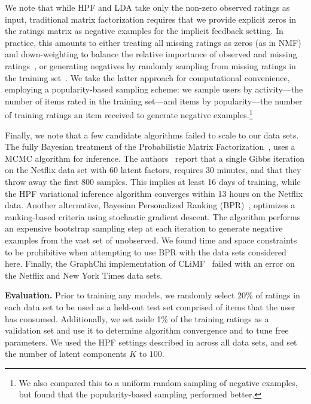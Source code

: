 We note that while HPF and LDA take only the non-zero observed
ratings as input, traditional matrix factorization requires that we
provide explicit zeros in the ratings matrix as negative examples for
the implicit feedback setting. In practice, this amounts to either
treating all missing ratings as zeros (as in NMF) and down-weighting
to balance the relative importance of observed and missing
ratings~\cite{Hu:2008p9402}, or generating negatives by randomly
sampling from missing ratings in the training
set~\cite{Gantner:2012p9364,Dror:2012a,Paquet:2013p9197}.  We take the
latter approach for computational convenience, employing a
popularity-based sampling scheme: we sample users by activity---the
number of items rated in the training set---and items by
popularity---the number of training ratings an item received to
generate negative examples.\footnote{We also compared this to a
  uniform random sampling of negative examples, but found that the
  popularity-based sampling performed better.} 

Finally, we note that a few candidate algorithms failed to scale to
our data sets. The fully Bayesian treatment of the Probabilistic
Matrix Factorization~\cite{Salakhutdinov:2008}, uses a MCMC algorithm
for inference. The authors~\cite{Salakhutdinov:2008} report that a
single Gibbs iteration on the Netflix data set with 60 latent factors,
requires 30 minutes, and that they throw away the first 800
samples. This implies at least 16 days of training, while the HPF
variational inference algorithm converges within 13 hours on the
Netflix data. Another alternative, Bayesian Personalized Ranking
(BPR)~\cite{Rendle:2009p9243,Gantner:2012p9364}, optimizes a
ranking-based criteria using stochastic gradient descent. The
algorithm performs an expensive bootstrap sampling step at each
iteration to generate negative examples from the vast set of
unobserved. We found time and space constraints to be prohibitive when
attempting to use BPR with the data sets considered here. Finally, the
GraphChi implementation of CLiMF~\cite{kyrola2012graphchi} failed with
an error on the Netflix and New York Times data sets.


{\bf Evaluation.} Prior to training any models, we randomly select
20\% of ratings in each data set to be used as a held-out test set
comprised of items that the user has consumed. Additionally, we set
aside 1\% of the training ratings as a validation set and use it to
determine algorithm convergence and to tune free parameters. We used
the HPF settings described in  across all
data sets, and set the number of latent components $K$ to $100$.

